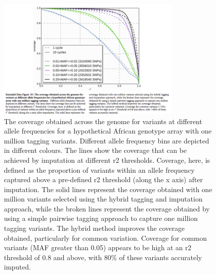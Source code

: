 \begin{figure}[htp]
\centering
\includegraphics[trim={0 4cm 0cm 1cm},clip,width=0.8\textwidth]{fig/f10}
\caption[Imputation accuracy for a hypothetical 1M SNP array.]{
The coverage obtained across the genome for variants at different allele frequencies for a hypothetical African genotype array with one million tagging variants. Different allele frequency bins are depicted in different colours. The lines show the coverage that can be achieved by imputation at different \gls{r2} thresholds. Coverage, here, is defined as the proportion of variants within an allele frequency captured above a pre-defined \gls{r2} threshold (along the x axis) after imputation. The solid lines represent the coverage obtained with one million variants selected using the hybrid tagging and imputation approach, while the broken lines represent the coverage obtained by using a simple pairwise tagging approach to capture one million tagging variants. The hybrid method improves the coverage obtained, particularly for common variation. Coverage for common variants (\gls{MAF} greater than 0.05) appears to be high at an \gls{r2} threshold of 0.8 and above, with 80\% of these variants accurately imputed.
}
\label{fig:f10}
\end{figure}